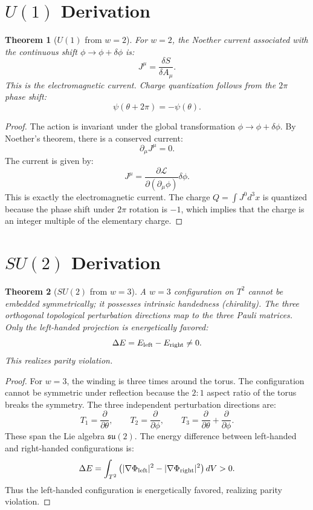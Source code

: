 \documentclass[12pt,oneside]{book}
\newtheorem{theorem}{Theorem}[chapter]
\begin{document}
\section{$U(1)$ Derivation}

\begin{theorem}[$U(1)$ from $w = 2$]
For $w = 2$, the Noether current associated with the continuous shift $\phi \rightarrow \phi + \delta\phi$ is:
\[
J^\mu = \frac{\delta S}{\delta A_\mu}.
\]
This is the electromagnetic current. Charge quantization follows from the $2\pi$ phase shift:
\[
\psi(\theta + 2\pi) = -\psi(\theta).
\]
\end{theorem}

\begin{proof}
The action is invariant under the global transformation $\phi \rightarrow \phi + \delta\phi$. By Noether's theorem, there is a conserved current:
\[
\partial_\mu J^\mu = 0.
\]
The current is given by:
\[
J^\mu = \frac{\partial\mathcal{L}}{\partial(\partial_\mu\phi)}\delta\phi.
\]
This is exactly the electromagnetic current. The charge $Q = \int J^0 d^3x$ is quantized because the phase shift under $2\pi$ rotation is $-1$, which implies that the charge is an integer multiple of the elementary charge.
\end{proof}

\section{$SU(2)$ Derivation}

\begin{theorem}[$SU(2)$ from $w = 3$]
A $w = 3$ configuration on $T^2$ cannot be embedded symmetrically; it possesses intrinsic handedness (chirality). The three orthogonal topological perturbation directions map to the three Pauli matrices. Only the left-handed projection is energetically favored:
\[
\Delta E = E_{\rm left} - E_{\rm right} \neq 0.
\]
This realizes parity violation.
\end{theorem}

\begin{proof}
For $w = 3$, the winding is three times around the torus. The configuration cannot be symmetric under reflection because the $2:1$ aspect ratio of the torus breaks the symmetry. The three independent perturbation directions are:
\[
T_1 = \frac{\partial}{\partial\theta}, \qquad T_2 = \frac{\partial}{\partial\phi}, \qquad T_3 = \frac{\partial}{\partial\theta} + \frac{\partial}{\partial\phi}.
\]
These span the Lie algebra $\mathfrak{su}(2)$. The energy difference between left-handed and right-handed configurations is:
\[
\Delta E = \int_{T^2} \left(|\nabla\Phi_{\rm left}|^2 - |\nabla\Phi_{\rm right}|^2\right) dV > 0.
\]
Thus the left-handed configuration is energetically favored, realizing parity violation.
\end{proof}
\end{document}
